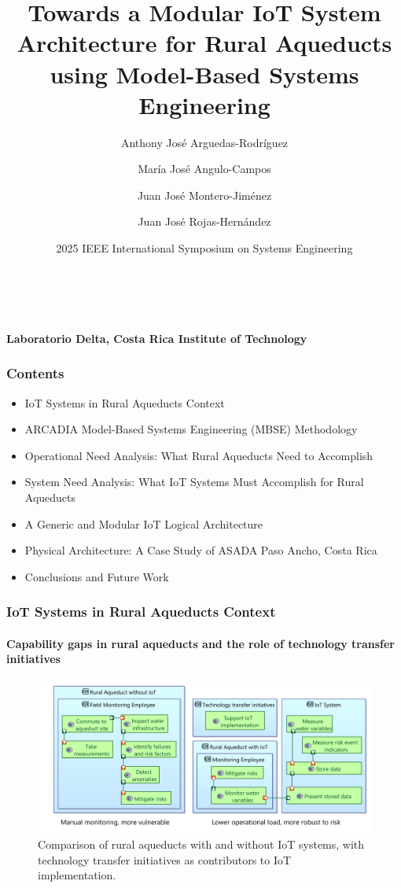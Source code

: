 \documentclass{beamer}
\title[IoT for Rural Aqueducts using MBSE]{Towards a Modular IoT System Architecture for Rural Aqueducts using Model-Based Systems Engineering}
\author[Laboratorio Delta]{Anthony José Arguedas-Rodríguez \and María José Angulo-Campos \and Juan José Montero-Jiménez \and Juan José Rojas-Hernández}
\date{2025 IEEE International Symposium on Systems Engineering}
\begin{document}
\begin{frame}
    \begin{center}
        {\LARGE \textbf{\inserttitle}} \\
        \vspace{0.5cm}
        {\insertauthor} \\
        \vspace{0.25cm}
        {\small \textbf{Laboratorio Delta, Costa Rica Institute of Technology}} \\
        \vspace{0.5cm}
        {\insertdate}
    \end{center}
\end{frame}

\begin{frame}
    \frametitle{Contents}
    \begin{itemize}
        \item IoT Systems in Rural Aqueducts Context
        \item ARCADIA Model-Based Systems Engineering (MBSE) Methodology
        \item Operational Need Analysis: What Rural Aqueducts Need to Accomplish
        \item System Need Analysis: What IoT Systems Must Accomplish for Rural Aqueducts
        \item A Generic and Modular IoT Logical Architecture
        \item Physical Architecture: A Case Study of ASADA Paso Ancho, Costa Rica
        \item Conclusions and Future Work
    \end{itemize}
\end{frame}

\begin{frame}
    \frametitle{IoT Systems in Rural Aqueducts Context}
    \framesubtitle{Capability gaps in rural aqueducts and the role of technology transfer initiatives}

    \begin{figure}
        \centering
        \includegraphics[width=\textwidth]{images/before_and_after_iot.png}
        \caption{Comparison of rural aqueducts with and without IoT systems, with technology transfer initiatives as contributors to IoT implementation.}
    \end{figure}
\end{frame}
\end{document}
